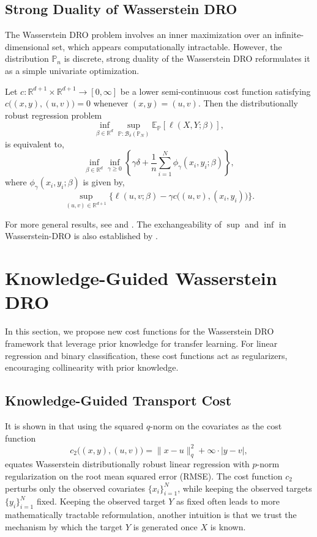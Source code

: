 \documentclass[12pt]{article}
\begin{document}
\subsection{Strong Duality of Wasserstein DRO}
The Wasserstein DRO problem involves an inner maximization over an infinite-dimensional set, which appears computationally intractable. However, the distribution $\mathbb{P}_n$ is discrete, strong duality of the Wasserstein DRO reformulates it as a simple univariate optimization.

\begin{prop}
\label{prop:duality}
    Let $c:\mathbb{R}^{d+1}\times \mathbb{R}^{d+1}\to [0,\infty]$ be a lower semi-continuous cost function satisfying $c\big((x,y),(u,v)\big) = 0$ whenever $(x,y) = (u,v)$. Then the distributionally robust regression problem \[
    \inf_{\beta\in\mathbb{R}^d} \sup_{\mathbb{P}:\mathcal{B}_\delta(\mathbb{P}_N)} \mathbb{E}_{\mathbb{P}}\left[\ell(X,Y;\beta) \right],
    \]is equivalent to, \[
    \inf_{\beta\in\mathbb{R}^d}\inf_{\gamma\geq 0}\left\{\gamma \delta + \dfrac{1}{n}\sum_{i=1}^N \phi_\gamma(x_i,y_i;\beta)\right\},
    \]where $\phi_\gamma(x_i,y_i;\beta)$ is given by, \[
        \sup_{(u,v)\in \mathbb{R}^{d+1}} \big\{ \ell(u,v;\beta) - \gamma c\big((u,v),(x_i,y_i) \big)\big\}.\]
\end{prop}For more general results, see  \citep[Theorem 1]{blanchet2019quantifying} and \citep[Section 2]{gao2022}. The exchangeability of $\sup$ and $\inf$ in Wasserstein-DRO is also established by \citep[Lemma 1]{blanchet2019rwpi}.

\section{Knowledge-Guided Wasserstein DRO}
\label{sec:kgdro}
In this section, we propose new cost functions for the Wasserstein DRO framework that leverage prior knowledge for transfer learning. For linear regression and binary classification, these cost functions act as regularizers, encouraging collinearity with prior knowledge.

\subsection{Knowledge-Guided Transport Cost}
It is shown in \citep[Theorem 1]{blanchet2019rwpi} that using the squared $q$-norm on the covariates as the cost function
\begin{equation}
c_2\big((x,y),(u,v)\big) = \|x - u\|_q^2 + \infty \cdot |y - v|,
\label{eqn:c_2}
\end{equation}
equates Wasserstein distributionally robust linear regression with $p$-norm regularization on the root mean squared error (RMSE). The cost function $c_2$ perturbs only the observed covariates $\{x_i\}_{i=1}^N$, while keeping the observed targets $\{y_i\}_{i=1}^N$ fixed. Keeping the observed target $Y$ as fixed often leads to more mathematically tractable reformulation, another intuition is that we trust the mechanism by which the target $Y$ is generated  once $X$ is known.
\end{document}
